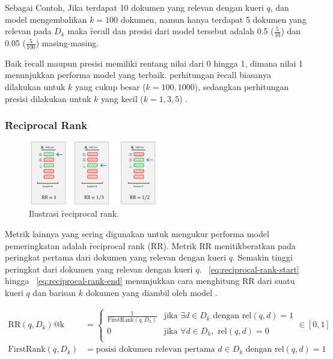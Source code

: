         Sebagai Contoh, Jika terdapat 10 dokumen yang relevan dengan kueri $q$, dan model mengembalikan $k=100$ dokumen, namun hanya terdapat 5 dokumen yang relevan pada $D_k$  maka \f{recall} dan presisi dari model tersebut adalah 0.5 ($\frac{5}{10}$) dan 0.05 ($\frac{5}{100}$) masing-masing. 
        
        Baik \f{recall} maupun presisi memiliki rentang nilai dari 0 hingga 1, dimana nilai 1 menunjukkan performa model yang terbaik. perhitungan \f{recall} biasanya dilakukan untuk $k$ yang cukup besar ($k = 100,1000 $), sedangkan perhitungan presisi dilakukan untuk $k$ yang kecil ($k = 1, 3, 5$) \citep{irlecture}.


        \subsubsection{\f{Reciprocal Rank}}

        \begin{figure}
            \centering
            \includegraphics[width=0.50\textwidth]{assets/pics/rr.png}
            \caption{Ilustrasi \f{reciprocal rank}.}
            \label{fig:reciprocal-rank}
        \end{figure}

        Metrik lainnya yang sering digunakan untuk mengukur performa model pemeringkatan adalah \f{reciprocal rank} (RR). Metrik RR menitikberatkan pada peringkat pertama dari dokumen yang relevan dengan kueri $q$. Semakin tinggi peringkat dari dokumen yang relevan dengan kueri $q$. \equ~\ref{eq:reciprocal-rank-start} hingga \equ~\ref{eq:reciprocal-rank-end} menunjukkan cara menghitung RR dari suatu kueri $q$ dan barisan $k$ dokumen yang diambil oleh model \citep{irlecture, textrankingsurvey}.

        \begin{align}
            \text{RR}(q, D_k)\text{@k} &= \begin{cases}
                \label{eq:reciprocal-rank-start}
                \frac{1}{\text{FirstRank}(q, D_k)} & \text{jika } \exists d \in D_k \text{ dengan } \text{rel}(q, d) = 1 \\        
                0 & \text{jika } \forall d \in D_k, \text{ rel}(q, d) = 0 \\
                \end{cases} \in [0, 1] \\
                \label{eq:reciprocal-rank-end}
                \text{FirstRank}(q,D_k) &= \text{posisi dokumen relevan pertama } d\in D_k \text{ dengan } \text{rel}(q, d) = 1
        \end{align}

